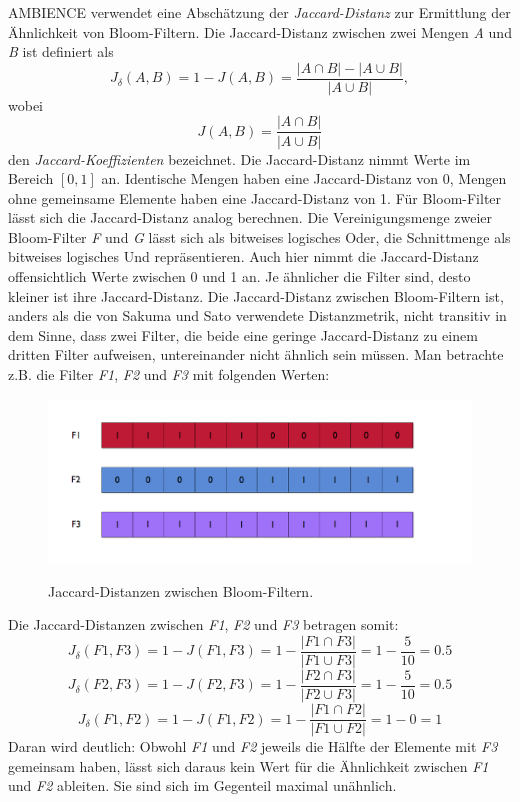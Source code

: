 AMBIENCE verwendet eine Abschätzung der \textit{Jaccard-Distanz} zur Ermittlung der Ähnlichkeit von Bloom-Filtern. Die Jaccard-Distanz zwischen zwei Mengen \textit{A} und \textit{B} ist definiert als 
\[J_{\delta}(A,B) = 1 - J(A,B) = \frac{|A\cap B| - |A\cup B|}{|A\cup B|}, \]
wobei 
\[J(A,B) = \frac{|A\cap B|}{|A\cup B|}\] den \textit{Jaccard-Koeffizienten} bezeichnet. Die Jaccard-Distanz nimmt Werte im Bereich $\left[0,1\right]$ an. Identische Mengen haben eine Jaccard-Distanz von 0, Mengen ohne gemeinsame Elemente haben eine Jaccard-Distanz von 1. 
Für Bloom-Filter lässt sich die Jaccard-Distanz analog berechnen. Die Vereinigungsmenge zweier Bloom-Filter \textit{F} und \textit{G} lässt sich als bitweises logisches Oder, die Schnittmenge als bitweises logisches Und repräsentieren. Auch hier nimmt die Jaccard-Distanz offensichtlich Werte zwischen 0 und 1 an. Je ähnlicher die Filter sind, desto kleiner ist ihre Jaccard-Distanz. 
Die Jaccard-Distanz zwischen Bloom-Filtern ist, anders als die von Sakuma und Sato verwendete Distanzmetrik, nicht transitiv in dem Sinne, dass zwei Filter, die beide eine geringe Jaccard-Distanz zu einem dritten Filter aufweisen, untereinander nicht ähnlich sein müssen. Man betrachte z.B. die Filter \textit{F1}, \textit{F2} und \textit{F3} mit folgenden Werten: 
\begin{figure}
  \centering
  \includegraphics[width=1.0\textwidth]{pictures/filters.png}\\
  \caption[Jaccard-Distanzen zwischen Bloom-Filtern]{Jaccard-Distanzen zwischen Bloom-Filtern.}\label{fig:pic1}
\end{figure}
\noindent
Die Jaccard-Distanzen zwischen \textit{F1}, \textit{F2} und \textit{F3} betragen somit: 
\[J_{\delta}(F1,F3) = 1 - J(F1,F3) = 1 - \frac{|F1\cap F3|}{|F1\cup F3|} = 1 - \frac{5}{10} = 0.5\]
\[J_{\delta}(F2,F3) = 1 - J(F2,F3) = 1 - \frac{|F2\cap F3|}{|F2\cup F3|} = 1 - \frac{5}{10} = 0.5\]
\[J_{\delta}(F1,F2) = 1 - J(F1,F2) = 1 - \frac{|F1\cap F2|}{|F1\cup F2|} = 1 - 0 = 1\]
Daran wird deutlich: Obwohl \textit{F1} und \textit{F2} jeweils die Hälfte der Elemente mit \textit{F3} gemeinsam haben, lässt sich daraus kein Wert für die Ähnlichkeit zwischen \textit{F1} und \textit{F2} ableiten. Sie sind sich im Gegenteil maximal unähnlich. 
